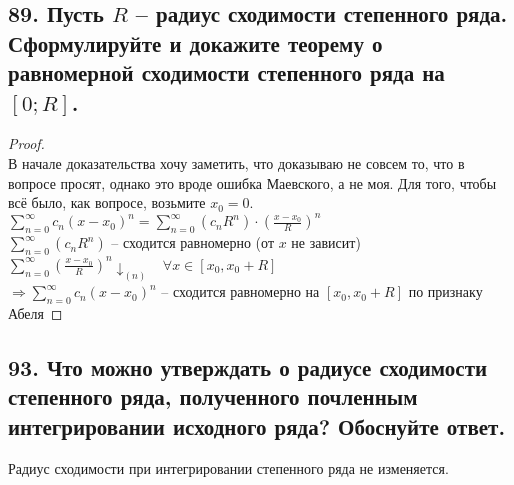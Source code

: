 \documentclass[a4paper, fleqn]{article}
\begin{document}
    \subsection*{89. Пусть $\displaystyle R$ -- радиус сходимости степенного
    ряда. Сформулируйте и докажите теорему о равномерной сходимости степенного ряда
    на $\displaystyle [0; R]$.}
    \begin{proof} \ \\
        В начале доказательства хочу заметить,
         что доказываю не совсем то, что в вопросе просят, однако это вроде 
         ошибка Маевского, а не моя. Для того, чтобы всё было, как вопросе, возьмите
         $\displaystyle x_0 = 0$. \\ 
         $\displaystyle \sum_{n = 0}^{\infty}c_n(x - x_0)^n =
         \sum_{n = 0}^{\infty}(c_nR^n)\cdot \left(\frac{x - x_0}{R}\right)^n$\\
         $\displaystyle \sum_{n = 0}^{\infty}(c_nR^n)$ -- сходится равномерно 
         (от $\displaystyle x$ не зависит) \\ 
         $\displaystyle \sum_{n = 0}^{\infty}\left(\frac{x - x_0}{R}\right)^n 
         \downarrow_{(n)}$ \ $\displaystyle \forall x \in [x_0, x_0 + R]$ \\ 
         $\displaystyle \Rightarrow \sum_{n = 0}^{\infty}c_n(x - x_0)^n$ -- сходится
         равномерно на $\displaystyle
         [x_0, x_0 + R]$
         по признаку Абеля 
    \end{proof}
    
        
        
        
    \subsection*{93. Что можно утверждать о радиусе сходимости степенного ряда, полученного почленным интегрировании исходного ряда? Обоснуйте ответ.}

    Радиус сходимости при интегрировании степенного ряда не изменяется.
\end{document}
